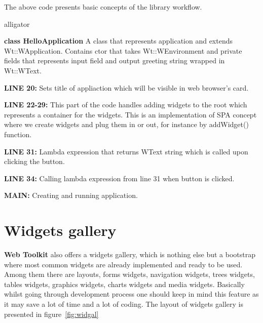 \documentclass[a4paper,12pt]{book}
\newcommand\tab[1][1cm]{\hspace*{#1}}
\begin{document}
{{\bigskip
The above code presents basic concepts of the library workflow.

\begin{labeling}{alligator}
\item [\textbf{class HelloApplication}] A class that represents application and extends Wt::WApplication. Contains ctor that takes Wt::WEnvironment and private fields that represents input field and output greeting string wrapped in Wt::WText.
\item [\textbf{LINE 20:}] Sets title of appliaction which will be visible in web browser's card.
\item [\textbf{LINE 22-29:}] This part of the code handles adding widgets to the root which represents a container for the widgets. This is an implementation of SPA concept where we create widgets and plug them in or out, for instance by addWidget() function.
\item [\textbf{LINE 31:}] Lambda expression that returns WText string which is called upon clicking the button.
\item [\textbf{LINE 34:}] Calling lambda expression from line 31 when button is clicked.
\item [\textbf{MAIN:}] Creating and running application.
\end{labeling} 


}
\section{Widgets gallery}
{
\tab \textbf{Web Toolkit} also offers a widgets gallery, which is nothing else but a bootstrap where most common widgets are already implemented and ready to be used. Among them there are layouts, forms widgets, navigation widgets, trees widgets, tables widgets, graphics widgets, charts widgets and media widgets. Basically whilst going through development process one should keep in mind this feature as it may save a lot of time and a lot of coding. The layout of widgets gallery is presented in figure~\ref{fig:widgal} 

}}
\end{document}

